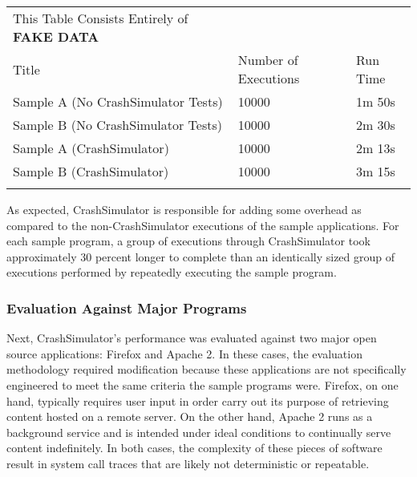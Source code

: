             \begin{table}[H]
                \scriptsize{}
                \begin{tabular} {l  l  l}
                    \toprule{}
                    This Table Consists Entirely of \textbf{FAKE DATA} \\
                    Title & Number of Executions & Run Time \\
                    Sample A (No CrashSimulator Tests) & 10000 & 1m 50s \\
                    Sample B (No CrashSimulator Tests) & 10000 & 2m 30s \\
                    Sample A (CrashSimulator) & 10000 & 2m 13s \\
                    Sample B (CrashSimulator) & 10000 & 3m 15s \\
                    \bottomrule{}
                \end{tabular}
            \end{table}

            As expected, CrashSimulator is responsible for adding some overhead as compared to the non-CrashSimulator
            executions of the sample applications. For each sample program, a group of executions through CrashSimulator
            took approximately 30 percent longer to complete than an identically sized group of executions performed by
            repeatedly executing the sample program.

        \subsubsection{Evaluation Against Major Programs}

            Next, CrashSimulator's performance was evaluated against two major open source applications: Firefox and
            Apache 2. In these cases, the evaluation methodology required modification because these applications are
            not specifically engineered to meet the same criteria the sample programs were. Firefox, on one hand,
            typically requires user input in order carry out its purpose of retrieving content hosted on a remote
            server. On the other hand, Apache 2 runs as a background service and is intended under ideal conditions to
            continually serve content indefinitely. In both cases, the complexity of these pieces of software result in
            system call traces that are likely not deterministic or repeatable.

